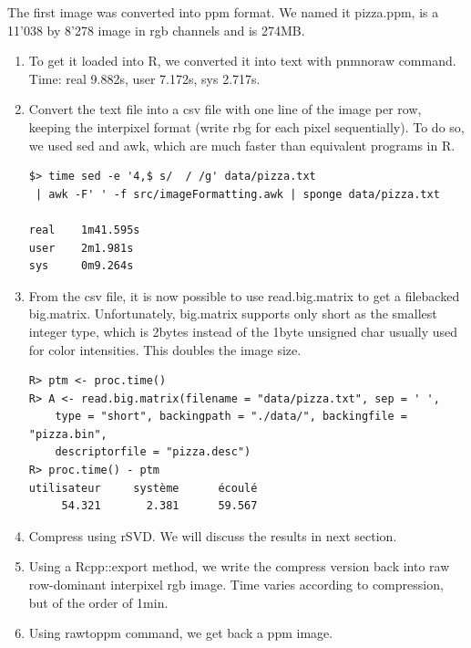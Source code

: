 \documentclass[a4paper,11pt]{amsart}
\begin{document}
The first image  was converted into ppm format. We named it pizza.ppm, is a 11'038 by 8'278 image in rgb channels and is 274MB.
\begin{enumerate}
  \item To get it loaded into R, we converted it into text with pnmnoraw command. Time: real 9.882s, user 7.172s, sys 2.717s.
  \item Convert the text file into a csv file with one line of the image per row, keeping the interpixel format (write rbg for each pixel sequentially). To do so, we used sed and awk, which are much faster than equivalent programs in R.
    \begin{verbatim}
$> time sed -e '4,$ s/  / /g' data/pizza.txt
 | awk -F' ' -f src/imageFormatting.awk | sponge data/pizza.txt
  
real    1m41.595s
user    2m1.981s
sys     0m9.264s
    \end{verbatim}
  \item From the csv file, it is now possible to use read.big.matrix to get a filebacked big.matrix. Unfortunately, big.matrix supports only short as the smallest integer type, which is 2bytes instead of the 1byte unsigned char usually used for color intensities. This doubles the image size.
\begin{verbatim}
R> ptm <- proc.time()
R> A <- read.big.matrix(filename = "data/pizza.txt", sep = ' ',
    type = "short", backingpath = "./data/", backingfile = "pizza.bin",
    descriptorfile = "pizza.desc")
R> proc.time() - ptm
utilisateur     système      écoulé
     54.321       2.381      59.567
\end{verbatim}
  \item Compress using rSVD. We will discuss the results in next section.
  \item Using a Rcpp::export method, we write the compress version back into raw row-dominant interpixel rgb image. Time varies according to compression, but of the order of 1min.
  \item Using rawtoppm command, we get back a ppm image.
\end{enumerate}
\end{document}

